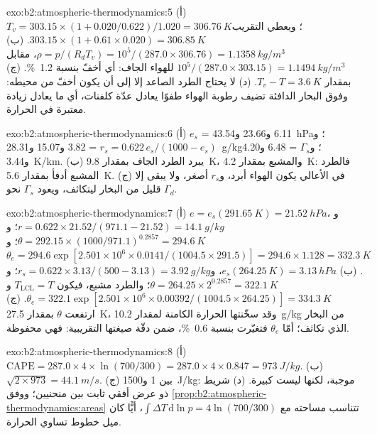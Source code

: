 \begin{solution}{exo:b2:atmospheric-thermodynamics:5}
(أ) $T_v = 303.15 \times (1 + 0.020/0.622)/1.020 = \qty{306.76}{K}$؛ ويعطي التقريب
$303.15 \times (1 + 0.61 \times 0.020) = \qty{306.85}{K}$. (ب) $\rho = p/(R_dT_v) = 10^5/(287.0
\times 306.76) = \qty{1.1358}{kg/m^3}$، مقابل $10^5/(287.0 \times 303.15) =
\qty{1.1494}{kg/m^3}$ للهواء الجاف: أي أخفّ بنسبة \qty{1.2}{\percent}. (ج) بمقدار $T_v - T =
\qty{3.6}{K}$. (د) لا يحتاج الطرد الصاعد إلا إلى أن يكون أخفّ من محيطه: وفوق البحار الدافئة
تضيف رطوبة الهواء طفوًا يعادل عدّة كلفنات، أي ما يعادل زيادة
معتبرة في الحرارة.
\end{solution}

\begin{solution}{exo:b2:atmospheric-thermodynamics:6}
(أ) $e_s$ = 6.11 و23.66 و\qty{43.54}{hPa}؛ و$r_s = 0.622\,e_s/(1000 - e_s)$ = 3.82 و15.07
و\qty{28.31}{g/kg}؛ و$\Gamma_s$ = 6.48 و4.20 و\qty{3.44}{K/km}. (ب) يبرد الطرد الجاف بمقدار
\qty{9.8}{K}، والمشبع بمقدار \qty{4.2}{K}: فالطرد المشبع أدفأ بمقدار \qty{5.6}{K}.
(ج) في الأعالي يكون الهواء أبرد، و$r_s$ أصغر، ولا يبقى إلا قليل من البخار ليتكاثف،
ويعود $\Gamma_s$ نحو $\Gamma_d$.
\end{solution}

\begin{solution}{exo:b2:atmospheric-thermodynamics:7}
(أ) $e = e_s(\qty{291.65}{K}) = \qty{21.52}{hPa}$، و$r = 0.622 \times 21.52/(971.1 - 21.52) =
\qty{14.1}{g/kg}$؛ و$\theta = 292.15 \times (1000/971.1)^{0.2857} = \qty{294.6}{K}$؛ و$\theta_e =
294.6 \exp[2.501 \times 10^6 \times 0.0141/(1004.5 \times 291.5)] = 294.6 \times 1.128 =
\qty{332.3}{K}$. (ب) $e_s(\qty{264.25}{K}) = \qty{3.13}{hPa}$، و$r_s = 0.622 \times 3.13/(500 -
3.13) = \qty{3.92}{g/kg}$؛ و$\theta = 264.25 \times 2^{0.2857} = \qty{322.1}{K}$؛ والطرد
مشبع، فيكون $T_{\text{LCL}} = T$ و$\theta_e = 322.1 \exp[2.501 \times 10^6 \times
0.00392/(1004.5 \times 264.25)] = \qty{334.3}{K}$. (ج) ارتفعت $\theta$ بمقدار \qty{27.5}{K}، وقد سخّنتها
الحرارة الكامنة لمقدار \qty{10.2}{g/kg} من البخار الذي تكاثف؛ أمّا $\theta_e$ فتغيّرت بنسبة
\qty{0.6}{\percent}، ضمن دقّة صيغتها التقريبية: فهي محفوظة.
\end{solution}

\begin{solution}{exo:b2:atmospheric-thermodynamics:8}
(أ) $\text{CAPE} = 287.0 \times 4 \times \ln(700/300) = 287.0 \times 4 \times 0.847 =
\qty{973}{J/kg}$. (ب) $\sqrt{2 \times 973} = \qty{44.1}{m/s}$. (ج) بين 1
و\qty{1500}{J/kg}: موجبة، لكنها ليست كبيرة. (د) شريط ذو عرض أفقي ثابت بين
منحنيين؛ ووفق \cref{prop:b2:atmospheric-thermodynamics:areas} تتناسب مساحته مع $\int
\Delta T\,\mathrm{d}\ln p = 4 \ln(700/300)$، أيًّا كان ميل خطوط تساوي الحرارة.
\end{solution}

